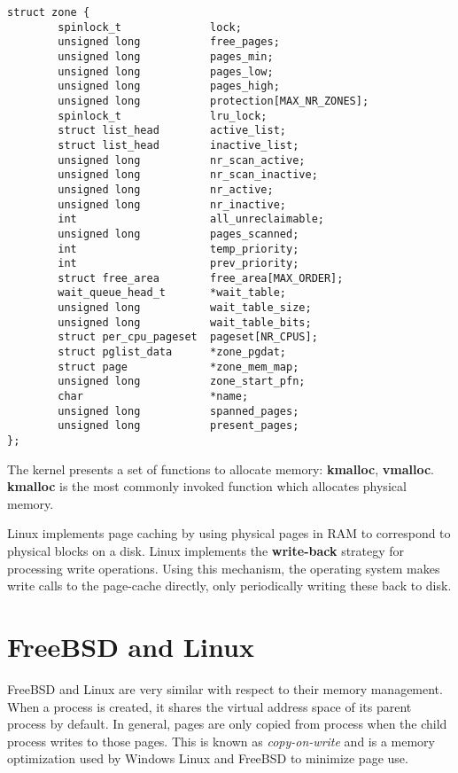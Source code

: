 \begin{lstlisting}
struct zone {
        spinlock_t              lock;
        unsigned long           free_pages;
        unsigned long           pages_min;
        unsigned long           pages_low;
        unsigned long           pages_high;
        unsigned long           protection[MAX_NR_ZONES];
        spinlock_t              lru_lock;
        struct list_head        active_list;
        struct list_head        inactive_list;
        unsigned long           nr_scan_active;
        unsigned long           nr_scan_inactive;
        unsigned long           nr_active;
        unsigned long           nr_inactive;
        int                     all_unreclaimable;
        unsigned long           pages_scanned;
        int                     temp_priority;
        int                     prev_priority;
        struct free_area        free_area[MAX_ORDER];
        wait_queue_head_t       *wait_table;
        unsigned long           wait_table_size;
        unsigned long           wait_table_bits;
        struct per_cpu_pageset  pageset[NR_CPUS];
        struct pglist_data      *zone_pgdat;
        struct page             *zone_mem_map;
        unsigned long           zone_start_pfn;
        char                    *name;
        unsigned long           spanned_pages;
        unsigned long           present_pages;
};
\end{lstlisting}

The kernel presents a set of functions to allocate memory: \textbf{kmalloc}, \textbf{vmalloc}. \textbf{kmalloc} is the most commonly invoked function which allocates physical memory.

Linux implements page caching by using physical pages in RAM to correspond to physical blocks on a disk.  Linux implements the \textbf{write-back} strategy for processing write operations.  Using this mechanism, the operating system makes write calls to the page-cache directly, only periodically writing these back to disk.

\section{FreeBSD and Linux}

	FreeBSD and Linux are very similar with respect to their memory management.  When a process is created, it shares the virtual address space of its parent process by default.  In general, pages are only copied from process when the child process writes to those pages.  This is known as \textit{copy-on-write} and is a memory optimization used by Windows Linux and FreeBSD to minimize page use.

